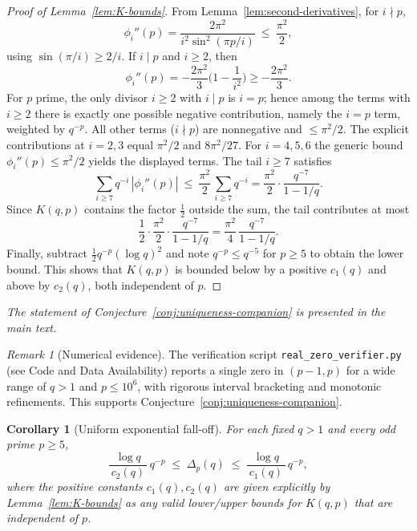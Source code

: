 \documentclass[11pt,a4paper]{amsart}
\theoremstyle{plain}
\newtheorem{corollary}[theorem]{Corollary}
\theoremstyle{definition}
\theoremstyle{remark}
\newtheorem{remark}[theorem]{Remark}
\begin{document}
\begin{proof}[Proof of Lemma~\ref{lem:K-bounds}]
From Lemma~\ref{lem:second-derivatives}, for $i\nmid p$,
\[
\phi_i''(p)=\frac{2\pi^2}{i^2\sin^2(\pi p/i)}\ \le\ \frac{\pi^2}{2},
\]
using $\sin(\pi/i)\ge 2/i$. If $i\mid p$ and $i\ge2$, then
\[
\phi_i''(p)=-\frac{2\pi^2}{3}\Big(1-\frac{1}{i^2}\Big)\ge -\frac{2\pi^2}{3}.
\]
For $p$ prime, the only divisor $i\ge 2$ with $i\mid p$ is $i=p$; hence among the terms with $i\ge2$ there is exactly one possible negative contribution, namely the $i=p$ term, weighted by $q^{-p}$. All other terms ($i\nmid p$) are nonnegative and $\le \pi^2/2$. The explicit contributions at $i=2,3$ equal $\pi^2/2$ and $8\pi^2/27$. For $i=4,5,6$ the generic bound $\phi_i''(p)\le \pi^2/2$ yields the displayed terms. The tail $i\ge7$ satisfies
\[
\sum_{i\ge7}q^{-i}\,|\phi_i''(p)|\ \le\ \frac{\pi^2}{2}\,\sum_{i\ge7}q^{-i}
=\frac{\pi^2}{2}\cdot\frac{q^{-7}}{1-1/q}.
\]
Since $K(q,p)$ contains the factor $\tfrac12$ outside the sum, the tail contributes at most
\[
\frac12\cdot \frac{\pi^2}{2}\cdot\frac{q^{-7}}{1-1/q}=\frac{\pi^2}{4}\,\frac{q^{-7}}{1-1/q}.
\]
Finally, subtract $\tfrac{1}{2}q^{-p}(\log q)^2$ and note $q^{-p}\le q^{-5}$ for $p\ge5$ to obtain the lower bound. This shows that $K(q,p)$ is bounded below by a positive $c_1(q)$ and above by $c_2(q)$, both independent of $p$.
\end{proof}

\begin{center}\emph{The statement of Conjecture~\ref{conj:uniqueness-companion} is presented in the main text.}\end{center}

\begin{remark}[Numerical evidence]
The verification script \texttt{real\_zero\_verifier.py} (see Code and Data Availability) reports a single zero in $(p-1,p)$ for a wide range of $q>1$ and $p\le 10^6$, with rigorous interval bracketing and monotonic refinements. This supports Conjecture~\ref{conj:uniqueness-companion}.
\end{remark}

\begin{corollary}[Uniform exponential fall-off]\label{cor:disp-bounds}
For each fixed $q>1$ and every odd prime $p\ge5$,
\[
\frac{\log q}{\,c_2(q)\,}\,q^{-p}\;\le\;\Delta_p(q)\;\le\;\frac{\log q}{\,c_1(q)\,}\,q^{-p},
\]
where the positive constants $c_1(q),c_2(q)$ are given explicitly by Lemma~\ref{lem:K-bounds} as any valid lower/upper bounds for $K(q,p)$ that are independent of $p$.
\end{corollary}
\end{document}
